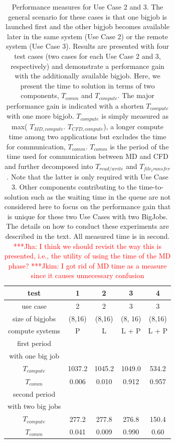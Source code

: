 \documentclass[conference,final]{IEEEtran}
\newcommand{\jhanote}[1]{ {\textcolor{red} { ***Jha: #1 }}}
\newcommand{\Jkimnote}[1]{ {\textcolor{red} { ***Jkim: #1 }}}
\newcommand{\jhanote}[1]{}
\newcommand{\Jkimnote}[1]{}
\begin{document}
\begin{table}[!h]
\begin{center}
\caption{\small Performance measures for Use Case 2 and 3.  The general scenario for these cases is that one bigjob is launched first and the other bigjob becomes available later in the same system (Use Case 2) or the remote system (Use Case 3).  Results are presented with four test cases (two cases for each Use Case 2 and 3, respectively) and demonstrate a performance gain with the additionally available bigjob. Here, we present the time to solution in terms of two components, ${T_{comm}}$  and ${T_{compute}}$. The major performance gain is indicated with a shorten ${T_{compute}}$ with one more bigjob.  ${T_{compute}}$ is simply measured as max( ${T _{MD,compute}}$. ${T_{CFD, compute}}$), a longer compute time among two applications but excludes the time for communication, ${T_{comm}}$.  ${T_{comm}}$ is the period of the time used for communication between MD and CFD and further decomposed into ${T_{read/write}}$ and ${T_{file_transfer}}$.  Note that the latter is only required with Use Case 3.  Other components contributing to the time-to-solution such as the waiting time in the queue are not considered here to focus on the performance gain that is unique for these two Use Cases with two BigJobs.  The details on how to conduct these experiments are described in the text.  All measured time is in second. \jhanote{I think we should revisit the way this is presented, i.e., the utility of using the time of the MD phase?} \Jkimnote{I got rid of MD time as a measure since it causes unnecessary confusion}  }
\label{table:TwoBigJobs}
\begin{tabular}{ c | c  c  c  c}
\hline
test & 1 & 2 & 3 & 4  \\

\hline
use case & 2 & 2 &3 &3 \\
size of bigjobs & (8,16)  & (8,16) & (8, 16) & (8,16) \\
compute systems & P  & L  &  L + P & L + P \\
\hline
first period &   & & & \\
with one big job & & & \\
${T_{compute}}$ & 1037.2& 1045.2 & 1049.0 & 534.2\\
${T_{comm}}$ & 0.006 & 0.010 & 0.912 & 0.957 \\
\hline
second period &   & & & \\
with two big jobs & & & \\
${T_{compute}}$ & 277.2 & 277.8& 276.8 & 150.4 \\
${T_{comm}}$ & 0.041 & 0.009 &  0.990 & 0.60 \\
\hline
\end{tabular}
\end{center}
\end{table}
\end{document}

